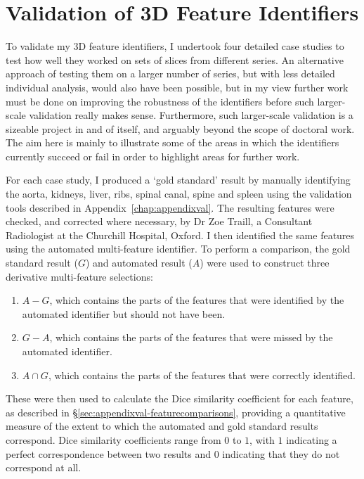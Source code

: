 
\section{Validation of 3D Feature Identifiers}


To validate my 3D feature identifiers, I undertook four detailed case studies to test how well they worked on sets of slices from different series. An alternative approach of testing them on a larger number of series, but with less detailed individual analysis, would also have been possible, but in my view further work must be done on improving the robustness of the identifiers before such larger-scale validation really makes sense. Furthermore, such larger-scale validation is a sizeable project in and of itself, and arguably beyond the scope of doctoral work. The aim here is mainly to illustrate some of the areas in which the identifiers currently succeed or fail in order to highlight areas for further work.

For each case study, I produced a `gold standard' result by manually identifying the aorta, kidneys, liver, ribs, spinal canal, spine and spleen using the validation tools described in Appendix~\ref{chap:appendixval}. The resulting features were checked, and corrected where necessary, by Dr Zoe Traill, a Consultant Radiologist at the Churchill Hospital, Oxford. I then identified the same features using the automated multi-feature identifier. To perform a comparison, the gold standard result ($G$) and automated result ($A$) were used to construct three derivative multi-feature selections:
%
\begin{enumerate}
\item $A - G$, which contains the parts of the features that were identified by the automated identifier but should not have been.
\item $G - A$, which contains the parts of the features that were missed by the automated identifier.
\item $A \cap G$, which contains the parts of the features that were correctly identified.
\end{enumerate}
%
These were then used to calculate the Dice similarity coefficient  for each feature, as described in \S\ref{sec:appendixval-featurecomparisons}, providing a quantitative measure of the extent to which the automated and gold standard results correspond. Dice similarity coefficients range from $0$ to $1$, with $1$ indicating a perfect correspondence between two results and $0$ indicating that they do not correspond at all.

